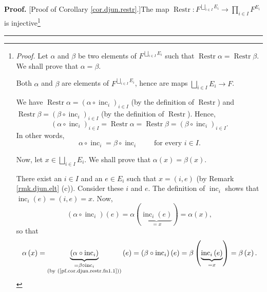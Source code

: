 \documentclass[numbers=enddot,12pt,final,onecolumn,notitlepage,abstracton]{scrartcl}
\theoremstyle{definition}
\newenvironment{proof}[1][Proof]{\noindent\textbf{#1.} }{\ \rule{0.5em}{0.5em}}
\let\prodnonlimits\prod
\renewcommand{\prod}{\prodnonlimits\limits}
\newenvironment{verlong}{}{}
\begin{document}
\begin{verlong}
\begin{footnotesize}
\begin{proof}
[Proof of Corollary \ref{cor.djun.restr}.]The map $\operatorname*{Restr}%
:F^{\bigsqcup_{i\in I}E_{i}}\rightarrow\prod_{i\in I}F^{E_{i}}$ is
injective\footnote{\textit{Proof.} Let $\alpha$ and $\beta$ be two elements of
$F^{\bigsqcup_{i\in I}E_{i}}$ such that $\operatorname*{Restr}\alpha
=\operatorname*{Restr}\beta$. We shall prove that $\alpha=\beta$.
\par
Both $\alpha$ and $\beta$ are elements of $F^{\bigsqcup_{i\in I}E_{i}}$, hence
are maps $\bigsqcup_{i\in I}E_{i}\rightarrow F$.
\par
We have $\operatorname*{Restr}\alpha=\left(  \alpha\circ\operatorname*{inc}%
\nolimits_{i}\right)  _{i\in I}$ (by the definition of $\operatorname*{Restr}%
$) and $\operatorname*{Restr}\beta=\left(  \beta\circ\operatorname*{inc}%
\nolimits_{i}\right)  _{i\in I}$ (by the definition of $\operatorname*{Restr}%
$). Hence,%
\[
\left(  \alpha\circ\operatorname*{inc}\nolimits_{i}\right)  _{i\in
I}=\operatorname*{Restr}\alpha=\operatorname*{Restr}\beta=\left(  \beta
\circ\operatorname*{inc}\nolimits_{i}\right)  _{i\in I}.
\]
In other words,
\begin{equation}
\alpha\circ\operatorname*{inc}\nolimits_{i}=\beta\circ\operatorname*{inc}%
\nolimits_{i}\ \ \ \ \ \ \ \ \ \ \text{for every }i\in I.
\label{pf.cor.djun.restr.fn1.1}%
\end{equation}
\par
Now, let $x\in\bigsqcup_{i\in I}E_{i}$. We shall prove that $\alpha\left(
x\right)  =\beta\left(  x\right)  $.
\par
There exist an $i\in I$ and an $e\in E_{i}$ such that $x=\left(  i,e\right)  $
(by Remark \ref{rmk.djun.elt} (c)). Consider these $i$ and $e$. The definition
of $\operatorname*{inc}\nolimits_{i}$ shows that $\operatorname*{inc}%
\nolimits_{i}\left(  e\right)  =\left(  i,e\right)  =x$. Now,%
\[
\left(  \alpha\circ\operatorname*{inc}\nolimits_{i}\right)  \left(  e\right)
=\alpha\left(  \underbrace{\operatorname*{inc}\nolimits_{i}\left(  e\right)
}_{=x}\right)  =\alpha\left(  x\right)  ,
\]
so that%
\[
\alpha\left(  x\right)  =\underbrace{\left(  \alpha\circ\operatorname*{inc}%
\nolimits_{i}\right)  }_{\substack{=\beta\circ\operatorname*{inc}%
\nolimits_{i}\\\text{(by (\ref{pf.cor.djun.restr.fn1.1}))}}}\left(  e\right)
=\left(  \beta\circ\operatorname*{inc}\nolimits_{i}\right)  \left(  e\right)
=\beta\left(  \underbrace{\operatorname*{inc}\nolimits_{i}\left(  e\right)
}_{=x}\right)  =\beta\left(  x\right)  .
\]}
\end{proof}
\end{footnotesize}
\end{verlong}
\end{document}
